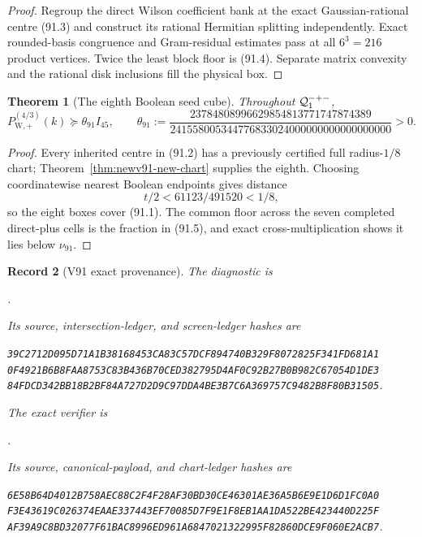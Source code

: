 \documentclass[11pt,oneside]{article}
\newtheorem{theorem}{Theorem}[section]
\newtheorem{record}[theorem]{Record}
\theoremstyle{definition}
\theoremstyle{remark}
\begin{document}
\begin{proof}
Regroup the direct Wilson coefficient bank at the exact
Gaussian-rational centre (91.3) and construct its rational Hermitian
splitting independently.  Exact rounded-basis congruence and
Gram-residual estimates pass at all \(6^3=216\) product vertices.
Twice the least block floor is (91.4).  Separate matrix convexity
and the rational disk inclusions fill the physical box.
\end{proof}

\begin{theorem}[The eighth Boolean seed cube]
\label{thm:newv91-seed-cube}
Throughout \({\cal Q}^{-+-}_1\),
\[
 P_{\mathrm W,+}^{(4/3)}(k)
 \succeq\theta_{91}I_{45},\qquad
 \theta_{91}:=
 \frac{23784808996629854813771747874389}
 {241558005344776833024000000000000000000}>0.         \tag{91.5}
\]
\end{theorem}

\begin{proof}
Every inherited centre in (91.2) has a previously certified full
radius-\(1/8\) chart; Theorem~\ref{thm:newv91-new-chart} supplies
the eighth.  Choosing coordinatewise nearest Boolean endpoints
gives distance
\[
 t/2<61123/491520<1/8,                               \tag{91.6}
\]
so the eight boxes cover (91.1).  The common floor across the seven
completed direct-plus cells is the fraction in (91.5), and exact
cross-multiplication shows it lies below \(\nu_{91}\).
\end{proof}

\begin{record}[V91 exact provenance]
\label{rec:newv91-provenance}
The diagnostic is
\begin{center}\footnotesize
{}.
\end{center}
Its source, intersection-ledger, and screen-ledger hashes are
\begin{center}\scriptsize
\texttt{39C2712D095D71A1B38168453CA83C57DCF894740B329F8072825F341FD681A1}\\
\texttt{0F4921B6B8FAA8753C83B436B70CED382795D4AF0C92B27B0B982C67054D1DE3}\\
\texttt{84FDCD342BB18B2BF84A727D2D9C97DDA4BE3B7C6A369757C9482B8F80B31505}.
\end{center}
The exact verifier is
\begin{center}\footnotesize
{}.
\end{center}
Its source, canonical-payload, and chart-ledger hashes are
\begin{center}\scriptsize
\texttt{6E58B64D4012B758AEC88C2F4F28AF30BD30CE46301AE36A5B6E9E1D6D1FC0A0}\\
\texttt{F3E43619C026374EAAE337443EF70085D7F9E1F8EB1AA1DA522BE423440D225F}\\
\texttt{AF39A9C8BD32077F61BAC8996ED961A6847021322995F82860DCE9F060E2ACB7}.
\end{center}
\end{record}
\end{document}
